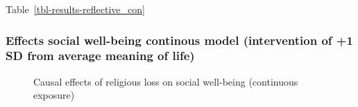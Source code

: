 \documentclass[
  singlecolumn,
  9pt]{scrartcl}
\begin{document}
Table~\ref{tbl-results-reflective_con}

\subsubsection{Effects social well-being continous model (intervention
of +1 SD from average meaning of
life)}\label{effects-social-well-being-continous-model-intervention-of-1-sd-from-average-meaning-of-life}

\begin{figure}


\caption{\label{fig-results-social-wellbeing_con}Causal effects of
religious loss on social well-being (continuous exposure)}

\end{figure}%
\end{document}
